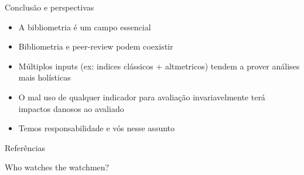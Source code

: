 \documentclass[bigger]{beamer}
\begin{document}
\begin{frame}[label={sec:org18f37f9}]{Conclusão e perspectivas}
\begin{itemize}
\item A bibliometria é um campo essencial
\item Bibliometria e peer-review podem coexistir
\item Múltiplos inputs (ex: indices clássicos + altmetricos) tendem a prover análises mais holísticas
\item O \alert{mal uso} de qualquer indicador para avaliação invariavelmente terá impactos danosos ao avaliado
\item Temos responsabilidade e vós nesse assunto
\end{itemize}
\end{frame}


\begin{frame}[fragile,allowframebreaks,label=]{Referências}
\printbibliography
\end{frame}

\begin{frame}[label={sec:org8e87141}]{Who watches the watchmen?}
\end{frame}
\end{document}
